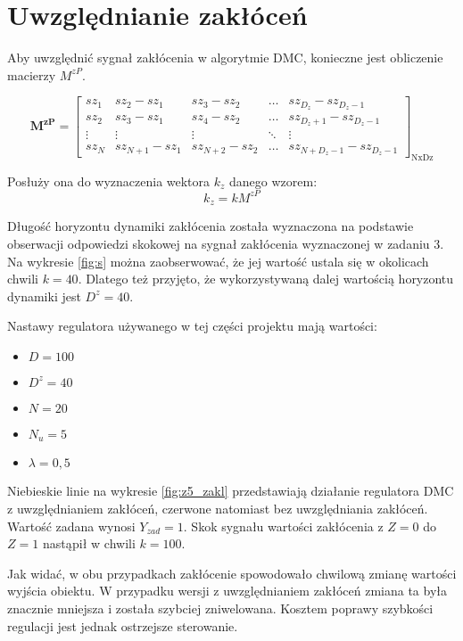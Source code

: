 

\chapter{Uwzględnianie zakłóceń}
Aby uwzględnić sygnał zakłócenia w algorytmie DMC, konieczne jest obliczenie macierzy $M^{zP}$.

\begin{equation}
\boldsymbol{M^{zP}}=\left[
\begin{array}
{ccccc}
sz_{1} & sz_{2}-sz_{1} & sz_{3}-sz_{2} & \ldots & sz_{D_z}-sz_{D_z-1}\\
sz_{2} & sz_{3}-sz_{1} & sz_{4}-sz_{2} & \ldots & sz_{D_z+1}-sz_{D_z-1}\\
\vdots & \vdots & \vdots & \ddots & \vdots\\
sz_{N} & sz_{N+1}-sz_{1} & sz_{N+2}-sz_{2} & \ldots &  sz_{N+D_z-1}-sz_{D_z-1}
\end{array}
\right]_{\mathrm{NxDz}}
\label{Mzp}
\end{equation}

Posłuży ona do wyznaczenia wektora $k_z$ danego wzorem:
\begin{equation}
k_z=kM^{zP}
\label{kz}
\end{equation}

Długość horyzontu dynamiki zakłócenia została wyznaczona na podstawie obserwacji odpowiedzi skokowej na sygnał zakłócenia wyznaczonej w zadaniu 3. Na wykresie \ref{fig:s} można zaobserwować, że jej wartość ustala się w okolicach chwili $k=40$. Dlatego też przyjęto, że wykorzystywaną dalej wartością horyzontu dynamiki jest $D^z=40$.

Nastawy regulatora używanego w tej części projektu mają wartości:
\begin{itemize}
	\item $D=100$
	\item $D^z=40$
	\item $N=20$
	\item $N_u=5$
	\item $\lambda=0,5$
\end{itemize}


Niebieskie linie na wykresie \ref{fig:z5_zakl} przedstawiają działanie regulatora DMC z uwzględnianiem zakłóceń, czerwone natomiast bez uwzględniania zakłóceń. Wartość zadana wynosi $Y_{zad}=1$. Skok sygnału wartości zakłócenia z $Z=0$ do $Z=1$ nastąpił w chwili $k=100$.

Jak widać, w obu przypadkach zakłócenie spowodowało chwilową zmianę wartości wyjścia obiektu. W przypadku wersji z uwzględnianiem zakłóceń zmiana ta była znacznie mniejsza i została szybciej zniwelowana. Kosztem poprawy szybkości regulacji jest jednak ostrzejsze sterowanie.

